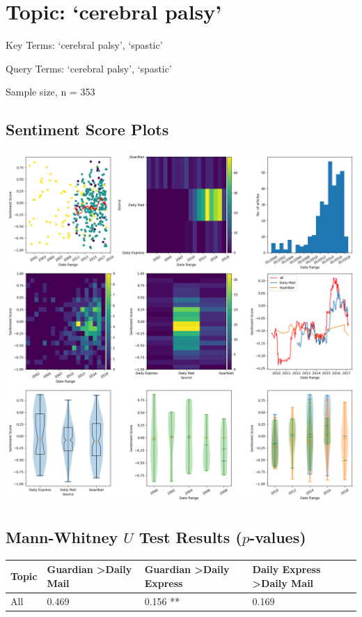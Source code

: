 \documentclass{report}
\begin{document}
\newpage
\section{Topic: `cerebral palsy'}
Key Terms: `cerebral palsy', `spastic'

\noindent Query Terms: `cerebral palsy', `spastic'

\noindent Sample size, n = 353

\subsection{Sentiment Score Plots}
\includegraphics[width=\textwidth]{raw/cerebral-palsy.png}

\subsection{Mann-Whitney $U$ Test Results ($p$-values)}
\noindent
\begin{tabu} to 1.0\textwidth { | X[c] | X[c] | X[c] | X[c] | }  
	\hline
	Topic & Guardian \textgreater\space Daily Mail & Guardian \textgreater\space Daily Express & Daily Express \textgreater\space Daily Mail  \\
	\hline
	All & 0.469 & 0.156 ** & 0.169  \\
	\hline
\end{tabu}
\end{document}
